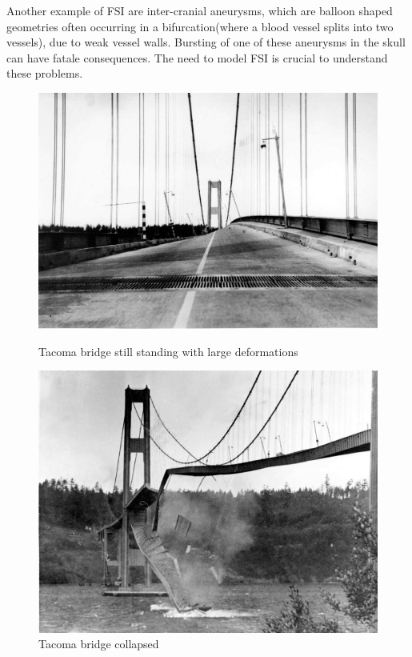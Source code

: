 Another example of FSI are inter-cranial aneurysms, which are balloon shaped geometries often occurring in a bifurcation(where a blood vessel splits into two vessels), due to weak vessel walls. Bursting of one of these aneurysms in the skull can have fatale consequences. The need to model FSI is crucial to understand these problems. \newline
\begin{figure}
\centering
\begin{minipage}{.51\textwidth}
  \centering
  \includegraphics[width=.95\linewidth]{./IntroductionToFSI/tacoma2.jpeg}
  \caption{Tacoma bridge still standing with large deformations}
  \label{fig:test1}
\end{minipage}%
\begin{minipage}{.50\textwidth}
  \centering
  \includegraphics[width=.95\linewidth]{./IntroductionToFSI/tacoma3.jpeg}
  \caption{Tacoma bridge collapsed}
  \label{fig:test2}
\end{minipage}
\end{figure}

